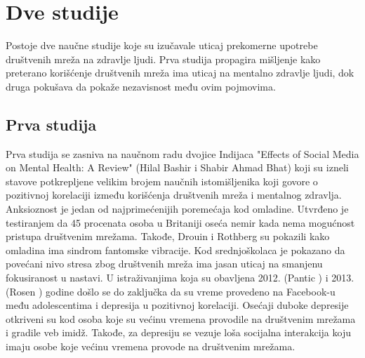 \documentclass[a4paper]{article}
\begin{document}
{\begin{itemize}
		\end{itemize}
	
		\section{Dve studije}	
		Postoje dve naučne studije koje su izučavale uticaj prekomerne upotrebe društvenih mreža na zdravlje ljudi. Prva studija propagira mišljenje kako preterano korišćenje društvenih mreža ima uticaj na mentalno zdravlje ljudi, dok druga pokušava da pokaže nezavisnost među ovim pojmovima.\\
		\subsection{Prva studija}
		Prva studija se zasniva na naučnom radu dvojice Indijaca "Effects of Social Media on Mental Health: A Review" \cite{prva} (Hilal Bashir i Shabir Ahmad Bhat) koji su izneli stavove potkrepljene velikim brojem naučnih istomišljenika koji govore o pozitivnoj korelaciji između korišćenja društvenih mreža i mentalnog zdravlja. Anksioznost je jedan od najprimećenijih poremećaja kod omladine. Utvrđeno je testiranjem da 45 procenata osoba u Britaniji oseća nemir kada nema mogućnost pristupa društvenim mrežama. Takođe, Drouin \cite{Drouin} i Rothberg \cite{Rothberg} su pokazili kako omladina ima sindrom fantomske vibracije. Kod srednjoškolaca je pokazano \cite{bashir} da povećani nivo stresa zbog društvenih mreža ima jasan uticaj na smanjenu fokusiranost u nastavi.  U istraživanjima koja su obavljena 2012. (Pantic \cite{panic}) i 2013. (Rosen \cite{rosen}) godine došlo se do zaključka da su vreme provedeno na Facebook-u među adolescentima i depresija u pozitivnoj korelaciji. Osećaji duboke depresije otkriveni su kod osoba koje su većinu vremena provodile na društvenim mrežama i gradile veb imidž. Takođe, za depresiju se vezuje loša socijalna interakcija koju imaju osobe koje većinu vremena provode na društvenim mrežama.\\
}
\end{document}
